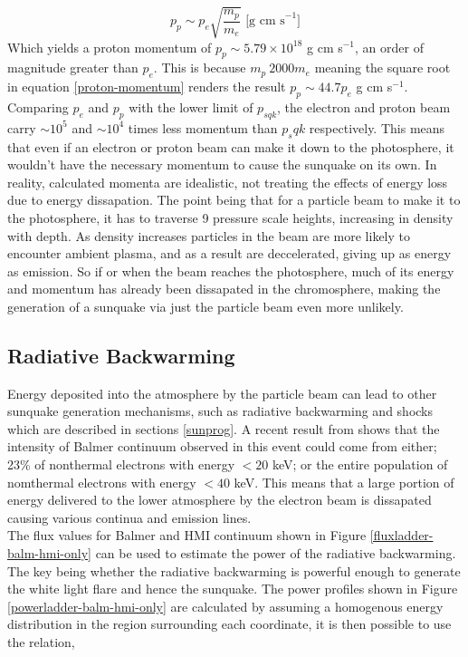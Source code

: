 \begin{equation}\label{proton-momentum}
p_p \sim p_e \sqrt{\frac{m_p}{m_e}} \text{ [g cm s}^{-1}]
\end{equation}
\noindent
Which yields a proton momentum of $p_p \sim 5.79{\times}10^18$ g cm s$^{-1}$, an order of magnitude greater than $p_e$. This is because $m_p ~ 2000m_e$ meaning the square root in equation \ref{proton-momentum} renders the result $p_p \sim 44.7p_e$ g cm s$^{-1}$. Comparing $p_{e}$ and $p_{p}$ with the lower limit of $p_{sqk}$, the electron and proton beam carry $\sim 10^{5}$ and $\sim 10^{4}$ times less momentum than $p_sqk$ respectively. This means that even if an electron or proton beam can make it down to the photosphere, it wouldn't have the necessary momentum to cause the sunquake on its own. In reality, calculated momenta are idealistic, not treating the effects of energy loss due to energy dissapation. The point being that for a particle beam to make it to the photosphere, it has to traverse 9 pressure scale heights, increasing in density with depth. As density increases particles in the beam are more likely to encounter ambient plasma, and as a result are deccelerated, giving up as energy as emission. So if or when the beam reaches the photosphere, much of its energy and momentum has already been dissapated in the chromosphere, making the generation of a sunquake via just the particle beam even more unlikely. \\

\subsection{Radiative Backwarming}
Energy deposited into the atmosphere by the particle beam can lead to other sunquake generation mechanisms, such as radiative backwarming and shocks which are described in sections \ref{sunprog}. A recent result from \cite{2016ApJ...816...88K} shows that the intensity of Balmer continuum observed in this event could come from either; 23\% of nonthermal electrons with energy $<20$ keV; or the entire population of nomthermal electrons with energy $<40$ keV. This means that a large portion of energy delivered to the lower atmosphere by the electron beam is dissapated causing various continua and emission lines. \\
\noindent
The flux values for Balmer and HMI continuum shown in Figure \ref{fluxladder-balm-hmi-only} can be used to estimate the power of the radiative backwarming. The key being whether the radiative backwarming is powerful enough to generate the white light flare and hence the sunquake. The power profiles shown in Figure \ref{powerladder-balm-hmi-only} are calculated by assuming a homogenous energy distribution in the region surrounding each coordinate, it is then possible to use the relation,

